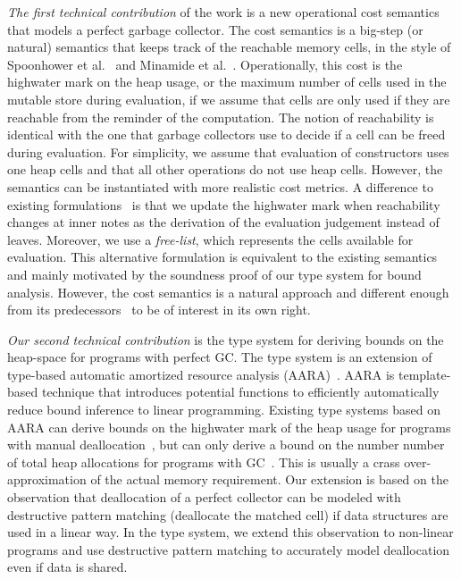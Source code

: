 \documentclass{easychair}
\theoremstyle{definition}
\begin{document}
\emph{The first technical contribution} of the work is a new
operational cost semantics that models a perfect garbage collector.
%
The cost semantics is a big-step (or natural) semantics that keeps
track of the reachable memory cells, in the style of Spoonhower et
al.~\cite{Spoonhower:2008:SPP:1411204.1411240} and Minamide et
al.~\cite{DBLP:journals/entcs/Minamide99}. Operationally, this cost is
the highwater mark on the heap usage, or the maximum number of cells
used in the mutable store during evaluation, if we assume that cells
are only used if they are reachable from the reminder of the
computation. The notion of reachability is identical with the one that
garbage collectors use to decide if a cell can be freed during
evaluation. For simplicity, we assume that evaluation of constructors
uses one heap cells and that all other operations do not use heap
cells. However, the semantics can be instantiated with more realistic
cost metrics. A difference to existing
formulations~\cite{Spoonhower:2008:SPP:1411204.1411240,DBLP:journals/entcs/Minamide99}
is that we update the highwater mark when reachability changes at
inner notes as the derivation of the evaluation judgement instead of
leaves. Moreover, we use a \emph{free-list}, which represents the
cells available for evaluation. This alternative formulation is
equivalent to the existing semantics and mainly motivated by the
soundness proof of our type system for bound analysis.  However, the
cost semantics is a natural approach and different enough from its
predecessors~\cite{Spoonhower:2008:SPP:1411204.1411240,DBLP:journals/entcs/Minamide99}
to be of interest in its own right.

\emph{Our second technical contribution} is the type system for
deriving bounds on the heap-space for programs with perfect GC. The
type system is an extension of type-based automatic amortized resource
analysis (AARA)~\cite{}. AARA is template-based technique that
introduces potential functions to efficiently automatically reduce
bound inference to linear programming. Existing type systems based on
AARA can derive bounds on the highwater mark of the heap usage for
programs with manual deallocation~\cite{}, but can only derive a bound
on the number number of total heap allocations for programs with
GC~\cite{}. This is usually a crass over-approximation of the actual
memory requirement. Our extension is based on the observation that
deallocation of a perfect collector can be modeled with destructive
pattern matching (deallocate the matched cell) if data structures are
used in a linear way. In the type system, we extend this observation
to non-linear programs and use destructive pattern matching to
accurately model deallocation even if data is shared.
\end{document}
